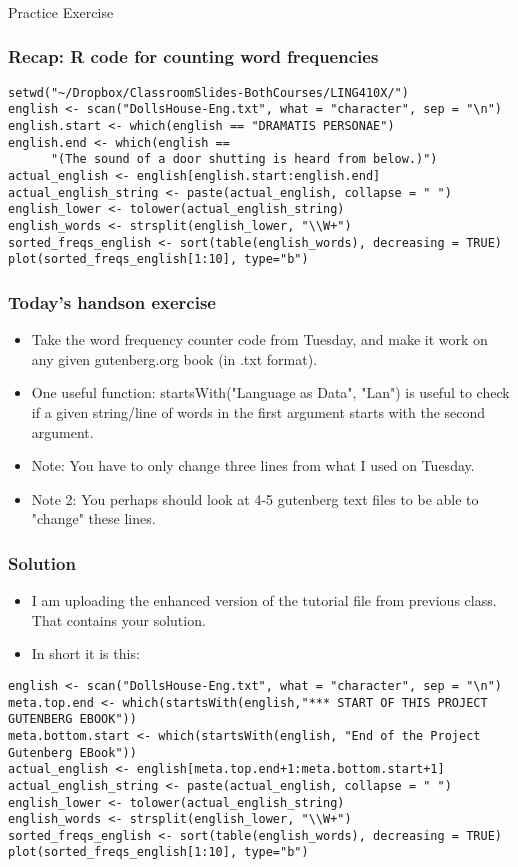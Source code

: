 \documentclass{beamer}
\begin{document}
\begin{frame}
\frametitle{}
\Large Practice Exercise
\end{frame}

\begin{frame}[fragile]
\frametitle{Recap: R code for counting word frequencies} 
\footnotesize
\begin{verbatim}
setwd("~/Dropbox/ClassroomSlides-BothCourses/LING410X/")
english <- scan("DollsHouse-Eng.txt", what = "character", sep = "\n")
english.start <- which(english == "DRAMATIS PERSONAE")
english.end <- which(english == 
      "(The sound of a door shutting is heard from below.)")
actual_english <- english[english.start:english.end]
actual_english_string <- paste(actual_english, collapse = " ")
english_lower <- tolower(actual_english_string)
english_words <- strsplit(english_lower, "\\W+")
sorted_freqs_english <- sort(table(english_words), decreasing = TRUE)
plot(sorted_freqs_english[1:10], type="b")
\end{verbatim}
\end{frame}

\begin{frame}
\frametitle{Today's handson exercise}
\begin{itemize}
\item Take the word frequency counter code from Tuesday, and make it work on any given gutenberg.org book (in .txt format).
\item One useful function: startsWith("Language as Data", "Lan") is useful to check if a given string/line of words in the first argument starts with the second argument. 
\item Note: You have to only change three lines from what I used on Tuesday.
\item Note 2: You perhaps should look at 4-5 gutenberg text files to be able to "change" these lines. 
\end{itemize}
\end{frame}

\begin{frame}[fragile]
\frametitle{Solution}
\begin{itemize}
\item I am uploading the enhanced version of the tutorial file from previous class. That contains your solution.
\item In short it is this:
\end{itemize}
\tiny
\begin{verbatim}
english <- scan("DollsHouse-Eng.txt", what = "character", sep = "\n")
meta.top.end <- which(startsWith(english,"*** START OF THIS PROJECT GUTENBERG EBOOK"))
meta.bottom.start <- which(startsWith(english, "End of the Project Gutenberg EBook"))
actual_english <- english[meta.top.end+1:meta.bottom.start+1]
actual_english_string <- paste(actual_english, collapse = " ")
english_lower <- tolower(actual_english_string)
english_words <- strsplit(english_lower, "\\W+")
sorted_freqs_english <- sort(table(english_words), decreasing = TRUE)
plot(sorted_freqs_english[1:10], type="b")
\end{verbatim}
\end{frame}
\end{document}
